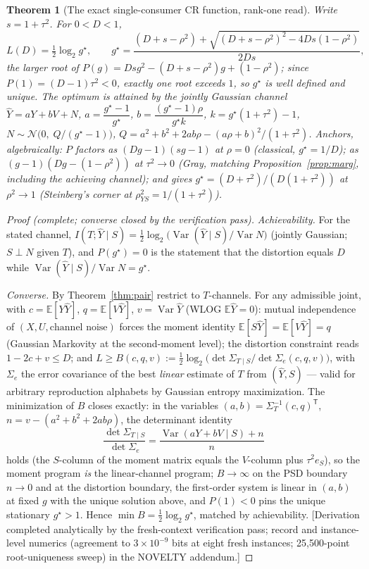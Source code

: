 \documentclass[11pt]{article}
\newtheorem{theorem}{Theorem}\newtheorem{corollary}{Corollary}
\newcommand{\E}{\mathbb{E}}\newcommand{\tr}{\operatorname{tr}}
\newcommand{\hY}{\widehat Y}
\begin{document}
\begin{theorem}[The exact single-consumer CR function, rank-one read]
\label{thm:cubic}
Write $s=1+\tau^2$. For $0<D<1$,
\begin{equation}
L(D)=\tfrac12\log_2 g^\star,\qquad
g^\star=\frac{(D+s-\rho^2)+\sqrt{(D+s-\rho^2)^2-4Ds(1-\rho^2)}}{2Ds},
\label{eq:quadratic}
\end{equation}
the larger root of $P(g)=Dsg^2-(D+s-\rho^2)g+(1-\rho^2)$; since
$P(1)=(D-1)\tau^2<0$, exactly one root exceeds $1$, so $g^\star$ is
well defined and unique. The optimum is attained by the jointly Gaussian
channel $\hY=aY+bV+N$, $a=\dfrac{g^\star-1}{g^\star}$,
$b=\dfrac{(g^\star-1)\rho}{g^\star k}$, $k=g^\star(1{+}\tau^2)-1$,
$N\sim\mathcal N\bigl(0,\;Q/(g^\star-1)\bigr)$,
$Q=a^2+b^2+2ab\rho-(a\rho+b)^2/(1{+}\tau^2)$. Anchors, algebraically:
$P$ factors as $(Dg-1)(sg-1)$ at $\rho=0$ (classical, $g^\star=1/D$); as
$(g-1)(Dg-(1-\rho^2))$ at $\tau^2\to0$ (Gray, matching
Proposition~\ref{prop:marg}, including the achieving channel); and gives
$g^\star=(D+\tau^2)/(D(1{+}\tau^2))$ at $\rho^2\to1$ (Steinberg's corner
at $\rho_{YS}^2=1/(1{+}\tau^2)$).
\end{theorem}
\begin{proof}[Proof (complete; converse closed by the verification pass)]
\emph{Achievability.} For the stated channel,
$I(T;\hY\mid S)=\tfrac12\log_2\bigl(\operatorname{Var}(\hY\mid S)/
\operatorname{Var}N\bigr)$ (jointly Gaussian; $S\perp N$ given $T$), and
$P(g^\star)=0$ is the statement that the distortion equals $D$ while
$\operatorname{Var}(\hY\mid S)/\operatorname{Var}N=g^\star$.

\emph{Converse.} By Theorem~\ref{thm:pair} restrict to $T$-channels. For
any admissible joint, with $c=\E[Y\hY]$, $q=\E[V\hY]$,
$v=\operatorname{Var}\hY$ (WLOG $\E\hY=0$): mutual independence of
$(X,U,\text{channel noise})$ forces the moment identity
$\E[S\hY]=\E[V\hY]=q$ (Gaussian Markovity at the second-moment level);
the distortion constraint reads $1-2c+v\le D$; and
$L\ge B(c,q,v):=\tfrac12\log_2
\bigl(\det\Sigma_{T\mid S}/\det\Sigma_e(c,q,v)\bigr)$, with $\Sigma_e$
the error covariance of the best \emph{linear} estimate of $T$ from
$(\hY,S)$ --- valid for arbitrary reproduction alphabets by Gaussian
entropy maximization. The minimization of $B$ closes exactly: in the
variables $(a,b)=\Sigma_T^{-1}(c,q)^{\mathsf T}$,
$n=v-(a^2+b^2+2ab\rho)$, the determinant identity
\[
\frac{\det\Sigma_{T\mid S}}{\det\Sigma_e}
=\frac{\operatorname{Var}(a Y+bV\mid S)+n}{n}
\]
holds (the $S$-column of the moment matrix equals the $V$-column plus
$\tau^2 e_S$), so the moment program \emph{is} the linear-channel program;
$B\to\infty$ on the PSD boundary $n\to0$ and at the distortion boundary,
the first-order system is linear in $(a,b)$ at fixed $g$ with the unique
solution above, and $P(1)<0$ pins the unique stationary $g^\star>1$.
Hence $\min B=\tfrac12\log_2 g^\star$, matched by achievability.
[Derivation completed analytically by the fresh-context verification
pass; record and instance-level numerics (agreement to $3\times10^{-9}$
bits at eight fresh instances; 25{,}500-point root-uniqueness sweep) in
the NOVELTY addendum.]
\end{proof}
\end{document}
